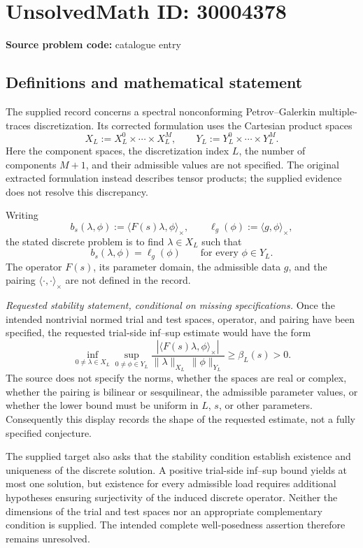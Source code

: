 \documentclass[11pt]{article}
\begin{document}
\section*{UnsolvedMath ID: 30004378}
\textbf{Source problem code:} catalogue entry
\subsection{Definitions and mathematical statement}
The supplied record concerns a spectral nonconforming Petrov--Galerkin multiple-traces discretization. Its corrected formulation uses the Cartesian product spaces
\[
X_L:=X_L^0\times\cdots\times X_L^M,
\qquad
Y_L:=Y_L^0\times\cdots\times Y_L^M.
\]
Here the component spaces, the discretization index \(L\), the number of components \(M+1\), and their admissible values are not specified. The original extracted formulation instead describes tensor products; the supplied evidence does not resolve this discrepancy.

Writing
\[
b_s(\lambda,\phi):=\langle F(s)\lambda,\phi\rangle_\times,
\qquad
\ell_g(\phi):=\langle g,\phi\rangle_\times,
\]
the stated discrete problem is to find \(\lambda\in X_L\) such that
\[
b_s(\lambda,\phi)=\ell_g(\phi)
\qquad\text{for every }\phi\in Y_L.
\]
The operator \(F(s)\), its parameter domain, the admissible data \(g\), and the pairing \(\langle\cdot,\cdot\rangle_\times\) are not defined in the record.

\emph{Requested stability statement, conditional on missing specifications.}
Once the intended nontrivial normed trial and test spaces, operator, and pairing have been specified, the requested trial-side inf--sup estimate would have the form
\[
\inf_{0\ne\lambda\in X_L}
\sup_{0\ne\phi\in Y_L}
\frac{\left|\langle F(s)\lambda,\phi\rangle_\times\right|}
{\|\lambda\|_{X_L}\,\|\phi\|_{Y_L}}
\geq\beta_L(s)>0.
\]
The source does not specify the norms, whether the spaces are real or complex, whether the pairing is bilinear or sesquilinear, the admissible parameter values, or whether the lower bound must be uniform in \(L\), \(s\), or other parameters. Consequently this display records the shape of the requested estimate, not a fully specified conjecture.

The supplied target also asks that the stability condition establish existence and uniqueness of the discrete solution. A positive trial-side inf--sup bound yields at most one solution, but existence for every admissible load requires additional hypotheses ensuring surjectivity of the induced discrete operator. Neither the dimensions of the trial and test spaces nor an appropriate complementary condition is supplied. The intended complete well-posedness assertion therefore remains unresolved.
\end{document}
